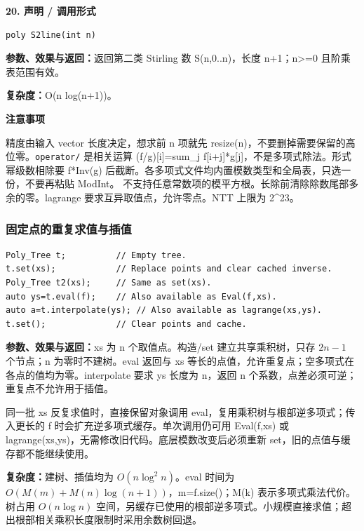 \documentclass[UTF8,a4paper,10pt]{ctexart}
\newcommand{\TemplNote}[1]{\textbf{注意事项}\par #1\par}
\begin{document}
\noindent\begin{minipage}{\textwidth}
\textbf{20. 声明 / 调用形式}
\begin{lstlisting}
poly S2line(int n)
\end{lstlisting}
\textbf{参数、效果与返回：}返回第二类 Stirling 数 S(n,0..n)，长度 n+1；n>=0 且阶乘表范围有效。

\textbf{复杂度：}O(n log(n+1))。

\TemplNote{精度由输入 vector 长度决定，想求前 n 项就先 resize(n)，不要删掉需要保留的高位零。\texttt{operator/} 是相关运算 (f/g)[i]=sum\_j f[i+j]*g[j]，不是多项式除法。形式幂级数相除要 f*Inv(g) 后截断。各多项式文件均内置模数类型和全局表，只选一份，不要再粘贴 ModInt。 不支持任意常数项的模平方根。长除前清除除数尾部多余的零。lagrange 要求互异取值点，允许零点。NTT 上限为 2\textasciicircum{}23。}
\end{minipage}\par\vspace{0.4em}

\noindent\begin{minipage}{\textwidth}
\subsubsection*{固定点的重复求值与插值}
\begin{lstlisting}
Poly_Tree t;          // Empty tree.
t.set(xs);            // Replace points and clear cached inverse.
Poly_Tree t2(xs);     // Same as set(xs).
auto ys=t.eval(f);    // Also available as Eval(f,xs).
auto a=t.interpolate(ys); // Also available as lagrange(xs,ys).
t.set();              // Clear points and cache.
\end{lstlisting}
\textbf{参数、效果与返回：}xs 为 n 个取值点。构造/set 建立共享乘积树，只存 $2n-1$ 个节点；n 为零时不建树。eval 返回与 xs 等长的点值，允许重复点；空多项式在各点的值均为零。interpolate 要求 ys 长度为 n，返回 n 个系数，点差必须可逆；重复点不允许用于插值。

同一批 xs 反复求值时，直接保留对象调用 eval，复用乘积树与根部逆多项式；传入更长的 f 时会扩充逆多项式缓存。单次调用仍可用 Eval(f,xs) 或 lagrange(xs,ys)，无需修改旧代码。底层模数改变后必须重新 set，旧的点值与缓存都不能继续使用。

\textbf{复杂度：}建树、插值均为 $O(n\log^2 n)$。eval 时间为 $O(M(m)+M(n)\log(n+1))$，m=f.size()；M(k) 表示多项式乘法代价。树占用 $O(n\log n)$ 空间，另缓存已使用的根部逆多项式。小规模直接求值；超出根部相关乘积长度限制时采用余数树回退。
\end{minipage}\par
\clearpage
\end{document}
